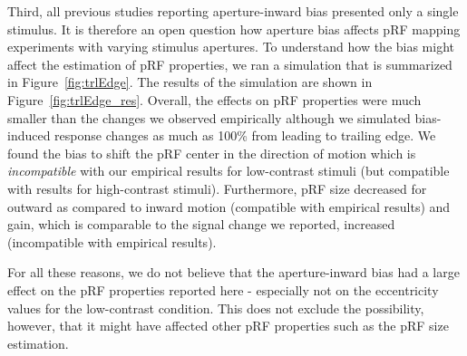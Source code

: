 Third, all previous studies reporting aperture-inward bias presented only a single stimulus. It is therefore an open question how aperture bias affects pRF mapping experiments with varying stimulus apertures. To understand how the bias might affect the estimation of pRF properties, we ran a simulation that is summarized in Figure~\ref{fig:trlEdge}. The results of the simulation are shown in Figure~\ref{fig:trlEdge_res}. Overall, the effects on pRF properties were much smaller than the changes we observed empirically although we simulated bias-induced response changes as much as 100\% from leading to trailing edge. We found the bias to shift the pRF center in the direction of motion which is \textit{incompatible} with our empirical results for low-contrast stimuli (but compatible with results for high-contrast stimuli). Furthermore, pRF size decreased for outward as compared to inward motion (compatible with empirical results) and gain, which is comparable to the signal change we reported, increased (incompatible with empirical results).

For all these reasons, we do not believe that the aperture-inward bias had a large effect on the pRF properties reported here - especially not on the eccentricity values for the low-contrast condition. This does not exclude the possibility, however, that it might have affected other pRF properties such as the pRF size estimation.

